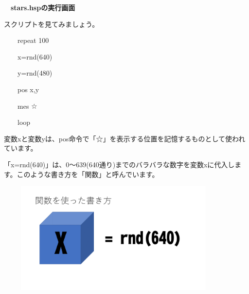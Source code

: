 \documentclass[a4paper,dvipdfmx]{jarticle}
\newcommand\textstyleqwerty[1]{#1}
\begin{document}
\bigskip


\bigskip


\bigskip


\bigskip


\bigskip


\bigskip


\bigskip


\bigskip


\bigskip


\bigskip


\bigskip

\textstyleqwerty{\textbf{　stars.hspの実行画面}}


\bigskip


\bigskip


\bigskip


\bigskip

スクリプトを見てみましょう。


\bigskip

\ \ \ \ repeat 100

\ \ \ \ x=rnd(640)

\ \ \ \ y=rnd(480)

\ \ \ \ pos x,y

\ \ \ \ mes {\textquotedbl}☆{\textquotedbl}

\ \ \ \ loop


\bigskip

変数xと変数yは、pos命令で「☆」を表示する位置を記憶するものとして使われています。

「x=rnd(640)」は、0〜639(640通り)までのバラバラな数字を変数xに代入します。このような書き方を「関数」と呼んでいます。



\begin{center}
\includegraphics[width=11.906cm,height=5.662cm]{text02-img/text02-img048.png}

\end{center}

\bigskip
\end{document}
